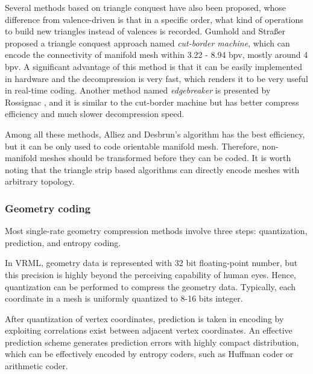 \documentclass[11pt, a4paper]{report}
\begin{document}
    Several methods based on triangle conquest have also been
    proposed, whose difference from valence-driven is that in a
    specific order, what kind of operations
    to build new triangles instead of valences is recorded. Gumhold and
    Stra\ss{}er \cite{280836} proposed a triangle conquest approach
    named \emph{cut-border machine}, which can encode the connectivity
    of manifold mesh within 3.22 - 8.94 bpv, mostly around 4 bpv. 
    A significant advantage of this method is that it can be easily implemented
    in hardware and the decompression is very fast, which
    renders it to be very useful in real-time coding. 
    Another method named \emph{edgebreaker} is presented by Rossignac \cite{614421},
    and it is similar to the cut-border machine but has better
    compress efficiency and much slower decompression speed.

    Among all these methods, Alliez and Desbrun's algorithm
    \cite{alliez01valencedriven} has the best efficiency, but it can
    be only used to code orientable manifold mesh. 
    Therefore, non-manifold meshes should be transformed before they can be coded.
    It is worth noting that the triangle strip based algorithms \cite{218391, 267103,
    789628} can directly encode meshes with arbitrary topology.
    \subsubsection*{Geometry coding}
    Most single-rate geometry compression methods involve three steps:
    quantization, prediction, and entropy coding.

    In VRML, geometry data is represented with 32 bit floating-point
    number, but this precision is highly beyond the perceiving
    capability of human eyes. Hence, quantization can be performed to
    compress the geometry data. Typically, each coordinate in a mesh is
    uniformly quantized to 8-16 bits integer.

    After quantization of vertex coordinates, prediction is taken in
    encoding by exploiting correlations exist between adjacent vertex
    coordinates. An effective prediction scheme generates prediction
    errors with highly compact distribution, which can be effectively
    encoded by entropy coders, such as Huffman coder or arithmetic
    coder. 
\end{document}
